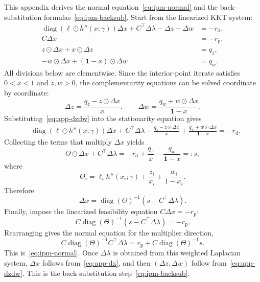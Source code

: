 \documentclass[12pt]{article}
\begin{document}
This appendix derives the normal equation~\eqref{eq:ipm-normal} and the
back-substitution formulas~\eqref{eq:ipm-backsub}. Start from the linearized KKT
system:
\[
\begin{aligned}
    \operatorname{diag}(\ell\odot h''(x;\gamma))\Delta x
        +C^\top\Delta\lambda-\Delta z+\Delta w &= -r_{\mathrm d},\\
    C\Delta x &= -r_{\mathrm p},\\
    z\odot\Delta x+x\odot\Delta z &= q_z,\\
    -w\odot\Delta x+(\mathbf 1-x)\odot\Delta w &= q_w.
\end{aligned}
\]
All divisions below are elementwise. Since the interior-point iterate satisfies
$0<x<1$ and $z,w>0$, the complementarity equations can be solved coordinate by
coordinate:
\begin{equation}\label{eq:app-dzdw}
    \Delta z=\frac{q_z-z\odot\Delta x}{x},
    \qquad
    \Delta w=\frac{q_w+w\odot\Delta x}{\mathbf 1-x}.
\end{equation}
Substituting~\eqref{eq:app-dzdw} into the stationarity equation gives
\[
\begin{aligned}
&\operatorname{diag}(\ell\odot h''(x;\gamma))\Delta x
    +C^\top\Delta\lambda
    -\frac{q_z-z\odot\Delta x}{x}
    +\frac{q_w+w\odot\Delta x}{\mathbf 1-x}
    =-r_{\mathrm d}.
\end{aligned}
\]
Collecting the terms that multiply $\Delta x$ yields
\[
    \Theta\odot\Delta x+C^\top\Delta\lambda
    =
    -r_{\mathrm d}+\frac{q_z}{x}-\frac{q_w}{\mathbf 1-x}
    =:s,
\]
where
\[
    \Theta_i=\ell_i h''(x_i;\gamma)+\frac{z_i}{x_i}
        +\frac{w_i}{1-x_i}.
\]
Therefore
\begin{equation}\label{eq:app-dx}
    \Delta x=\operatorname{diag}(\Theta)^{-1}(s-C^\top\Delta\lambda).
\end{equation}
Finally, impose the linearized feasibility equation $C\Delta x=-r_{\mathrm p}$:
\[
    C\operatorname{diag}(\Theta)^{-1}(s-C^\top\Delta\lambda)
    =-r_{\mathrm p}.
\]
Rearranging gives the normal equation for the multiplier direction,
\[
    C\operatorname{diag}(\Theta)^{-1}C^\top\Delta\lambda
    =
    r_{\mathrm p}+C\operatorname{diag}(\Theta)^{-1}s.
\]
This is~\eqref{eq:ipm-normal}. Once $\Delta\lambda$ is obtained from this
weighted Laplacian system, $\Delta x$ follows from~\eqref{eq:app-dx}, and then
$(\Delta z,\Delta w)$ follow from~\eqref{eq:app-dzdw}. This is the
back-substitution step~\eqref{eq:ipm-backsub}.



\end{document}
